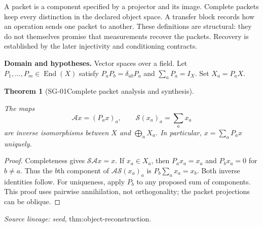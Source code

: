 \documentclass[11pt]{article}
\newtheorem{theorem}{Theorem}[section]
\theoremstyle{definition}\newtheorem{definition}[theorem]{Definition}
\theoremstyle{remark}\newtheorem{remark}[theorem]{Remark}
\begin{document}
A packet is a component specified by a projector and its image. Complete
packets keep every distinction in the declared object space. A transfer block
records how an operation sends one packet to another. These definitions are
structural: they do not themselves promise that measurements recover the
packets. Recovery is established by the later injectivity and conditioning
contracts.


\par{\small\textbf{Domain and hypotheses.} Vector spaces over a field. Let $P_1,\ldots,P_m\in\operatorname{End}(X)$ satisfy $P_aP_b=\delta_{ab}P_a$ and $\sum_aP_a=I_X$. Set $X_a=P_aX$.}\par
\begin{theorem}[SG-01\quad Complete packet analysis and synthesis]\label{SG-01}

The maps
\[
 \mathcal A x=(P_ax)_a,\qquad
 \mathcal S(x_a)_a=\sum_ax_a
\]
are inverse isomorphisms between $X$ and $\bigoplus_aX_a$. In particular,
$x=\sum_aP_ax$ uniquely.

\end{theorem}
\begin{proof}

Completeness gives $\mathcal S\mathcal A x=x$. If $x_a\in X_a$, then
$P_ax_a=x_a$ and $P_bx_a=0$ for $b\ne a$. Thus the $b$th component of
$\mathcal A\mathcal S(x_a)_a$ is $P_b\sum_ax_a=x_b$.
Both inverse identities follow. For uniqueness, apply $P_b$ to any proposed
sum of components. This proof uses pairwise annihilation, not orthogonality;
the packet projections can be oblique.

\end{proof}

\par{\small\color{Teal}\textit{Source lineage:} \textit{seed}, thm:object-reconstruction.}\par
\end{document}
